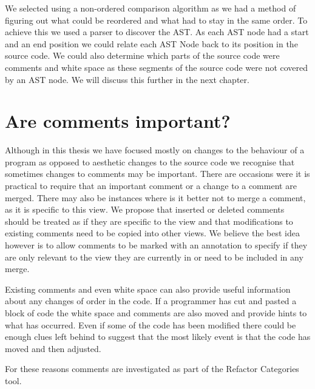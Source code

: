 We selected using a non-ordered comparison algorithm as we had a method of figuring out what could be reordered and what had to stay in the same order.  To achieve this we used a parser to discover the AST.  As each AST node had a start and an end position we could relate each AST Node back to its position in the source code.  We could also determine which parts of the source code were comments and white space as these segments of the source code were not covered by an AST node. We will discuss this further in the next chapter.

\section{Are comments important?}
Although in this thesis we have focused mostly on changes to the behaviour of a program as opposed to aesthetic changes to the source code we recognise that sometimes changes to comments may be important.  There are occasions were it is practical to require that an important comment or a change to a comment are merged.  There may also be instances where is it better not to merge a comment, as it is specific to this view.  We propose that inserted or deleted comments should be treated as if they are specific to the view and that modifications to existing comments need to be copied into other views.  We believe the best idea however is to allow comments to be marked with an annotation to specify if they are only relevant to the view they are currently in or need to be included in any merge. 

Existing comments and even white space can also provide useful information about any changes of order in the code.  If a programmer has cut and pasted a block of code the white space and comments are also moved and provide hints to what has occurred.  Even if some of the code has been modified there could be enough clues left behind to suggest that the most likely event is that the code has moved and then adjusted.

For these reasons comments are investigated as part of the Refactor Categories tool.

